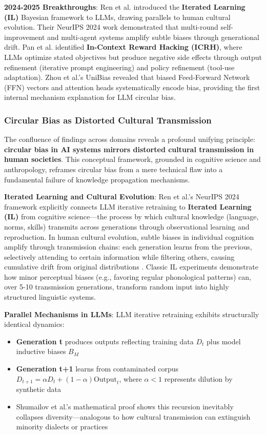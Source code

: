 \documentclass[11pt,a4paper]{article}
\begin{document}
\textbf{2024-2025 Breakthroughs}: Ren et al. \cite{ren2024} introduced the \textbf{Iterated Learning (IL)} Bayesian framework to LLMs, drawing parallels to human cultural evolution. Their NeurIPS 2024 work demonstrated that multi-round self-improvement and multi-agent systems amplify subtle biases through generational drift. Pan et al. \cite{pan2024} identified \textbf{In-Context Reward Hacking (ICRH)}, where LLMs optimize stated objectives but produce negative side effects through output refinement (iterative prompt engineering) and policy refinement (tool-use adaptation). Zhou et al.'s UniBias \cite{zhou2024} revealed that biased Feed-Forward Network (FFN) vectors and attention heads systematically encode bias, providing the first internal mechanism explanation for LLM circular bias.

\subsubsection{Circular Bias as Distorted Cultural Transmission}

The confluence of findings across domains reveals a profound unifying principle: \textbf{circular bias in AI systems mirrors distorted cultural transmission in human societies}. This conceptual framework, grounded in cognitive science and anthropology, reframes circular bias from a mere technical flaw into a fundamental failure of knowledge propagation mechanisms.

\textbf{Iterated Learning and Cultural Evolution}:  
Ren et al.'s \cite{ren2024} NeurIPS 2024 framework explicitly connects LLM iterative retraining to \textbf{Iterated Learning (IL)} from cognitive science—the process by which cultural knowledge (language, norms, skills) transmits across generations through observational learning and reproduction. In human cultural evolution, subtle biases in individual cognition amplify through transmission chains: each generation learns from the previous, selectively attending to certain information while filtering others, causing cumulative drift from original distributions \cite{ren2024}. Classic IL experiments demonstrate how minor perceptual biases (e.g., favoring regular phonological patterns) can, over 5-10 transmission generations, transform random input into highly structured linguistic systems.

\textbf{Parallel Mechanisms in LLMs}:  
LLM iterative retraining exhibits structurally identical dynamics:
\begin{itemize}
    \item \textbf{Generation t} produces outputs reflecting training data $D_t$ plus model inductive biases $B_M$
    \item \textbf{Generation t+1} learns from contaminated corpus $D_{t+1} = \alpha D_t + (1-\alpha) \text{Output}_t$, where $\alpha < 1$ represents dilution by synthetic data
    \item Shumailov et al.'s \cite{shumailov2024} mathematical proof shows this recursion inevitably collapses diversity—analogous to how cultural transmission can extinguish minority dialects or practices
\end{itemize}
\end{document}
